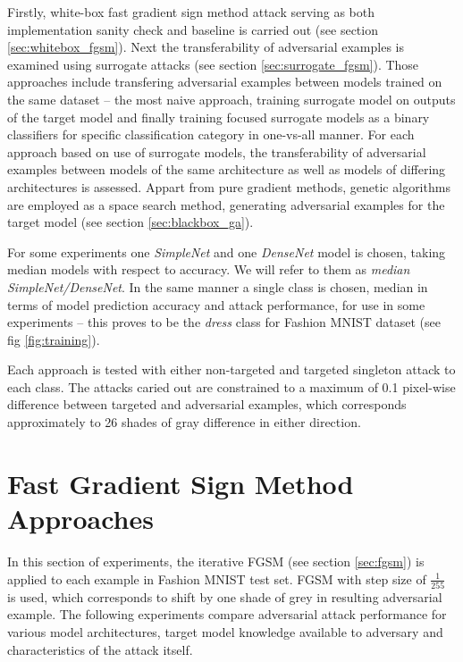 Firstly, white-box fast gradient sign method attack serving as both implementation sanity check and baseline is carried out (see section \ref{sec:whitebox_fgsm}). Next the transferability of adversarial examples is examined using surrogate attacks (see section \ref{sec:surrogate_fgsm}). Those approaches include transfering adversarial examples between models trained on the same dataset -- the most naive approach, training surrogate model on outputs of the target model and finally training focused surrogate models as a binary classifiers for specific classification category in one-vs-all manner. For each approach based on use of surrogate models, the transferability of adversarial examples between models of the same architecture as well as models of differing architectures is assessed. Appart from pure gradient methods, genetic algorithms are employed as a space search method, generating adversarial examples for the target model (see section \ref{sec:blackbox_ga}).

For some experiments one \emph{SimpleNet} and one \emph{DenseNet} model is chosen, taking median models with respect to accuracy. We will refer to them as \emph{median SimpleNet/DenseNet}. In the same manner a single class is chosen, median in terms of model prediction accuracy and attack performance, for use in some experiments -- this proves to be the \emph{dress} class for Fashion MNIST dataset (see fig \ref{fig:training}).

Each approach is tested with either non-targeted and targeted singleton attack to each class. The attacks caried out are constrained to a maximum of 0.1 pixel-wise difference between targeted and adversarial examples, which corresponds approximately to 26 shades of gray difference in either direction.

\section{Fast Gradient Sign Method Approaches}
In this section of experiments, the iterative FGSM (see section \ref{sec:fgsm}) is applied to each example in Fashion MNIST test set. FGSM with step size of $\frac{1}{255}$ is used, which corresponds to shift by one shade of grey in resulting adversarial example. The following experiments compare adversarial attack performance for various model architectures, target model knowledge available to adversary and characteristics of the attack itself.

